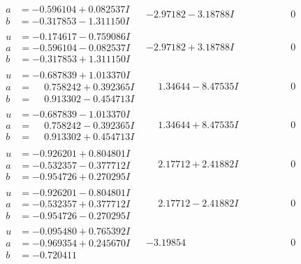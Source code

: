 \documentclass[1p]{elsarticle_modified}
\theoremstyle{definition}
\begin{document}
$$\begin{array}{c|c|c}
\begin{aligned}
a &= -0.596104 + 0.082537 I \\
b &= -0.317853 - 1.311150 I\end{aligned}
 & -2.97182 - 3.18788 I & \phantom{-0.000000 } 0 \\ \hline\begin{aligned}
u &= -0.174617 - 0.759086 I \\
a &= -0.596104 - 0.082537 I \\
b &= -0.317853 + 1.311150 I\end{aligned}
 & -2.97182 + 3.18788 I & \phantom{-0.000000 } 0 \\ \hline\begin{aligned}
u &= -0.687839 + 1.013370 I \\
a &= \phantom{-}0.758242 + 0.392365 I \\
b &= \phantom{-}0.913302 - 0.454713 I\end{aligned}
 & \phantom{-}1.34644 - 8.47535 I & \phantom{-0.000000 } 0 \\ \hline\begin{aligned}
u &= -0.687839 - 1.013370 I \\
a &= \phantom{-}0.758242 - 0.392365 I \\
b &= \phantom{-}0.913302 + 0.454713 I\end{aligned}
 & \phantom{-}1.34644 + 8.47535 I & \phantom{-0.000000 } 0 \\ \hline\begin{aligned}
u &= -0.926201 + 0.804801 I \\
a &= -0.532357 - 0.377712 I \\
b &= -0.954726 + 0.270295 I\end{aligned}
 & \phantom{-}2.17712 + 2.41882 I & \phantom{-0.000000 } 0 \\ \hline\begin{aligned}
u &= -0.926201 - 0.804801 I \\
a &= -0.532357 + 0.377712 I \\
b &= -0.954726 - 0.270295 I\end{aligned}
 & \phantom{-}2.17712 - 2.41882 I & \phantom{-0.000000 } 0 \\ \hline\begin{aligned}
u &= -0.095480 + 0.765392 I \\
a &= -0.969354 + 0.245670 I \\
b &= -0.720411\phantom{ +0.000000I}\end{aligned}
 & -3.19854\phantom{ +0.000000I} & \phantom{-0.000000 } 0\\

\end{array}$$
\end{document}
